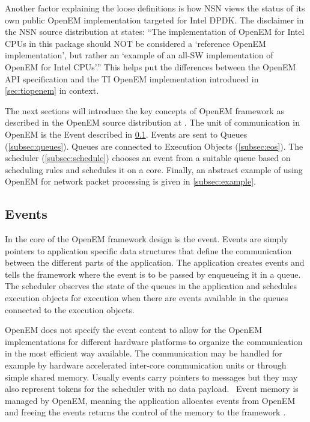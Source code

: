 Another factor explaining the loose definitions is how NSN views the status of its own public OpenEM implementation targeted for Intel DPDK. The disclaimer in the NSN source distribution at \cite{openempage} states: ``The implementation of OpenEM for Intel CPUs in this package should NOT be considered a `reference OpenEM implementation', but rather an `example of an all-SW implementation of OpenEM for Intel CPUs'.'' This helps put the differences between the OpenEM API specification and the TI OpenEM implementation introduced in \ref{sec:tiopenem} in context.

The next sections will introduce the key concepts of OpenEM framework as described in the OpenEM source distribution at \cite{openempage}. The unit of communication in OpenEM is the Event described in \ref{subsec:event}. Events are sent to Queues (\ref{subsec:queues}). Queues are connected to Execution Objects (\ref{subsec:eos}). The scheduler (\ref{subsec:schedule}) chooses an event from a suitable queue based on scheduling rules and schedules it on a core. Finally, an abstract example of using OpenEM for network packet processing is given in \ref{subsec:example}.

\subsection{Events}
\label{subsec:event}
In the core of the OpenEM framework design is the event. Events are simply pointers to application specific data structures that define the communication between the different parts of the application. The application creates events and tells the framework where the event is to be passed by enqueueing it in a queue. The scheduler observes the state of the queues in the application and schedules execution objects for execution when there are events available in the queues connected to the execution objects.~\cite{openemintro}

OpenEM does not specify the event content to allow for the OpenEM implementations for different hardware platforms to organize the communication in the most efficient way available. The communication may be handled for example by hardware accelerated inter-core communication units or through simple shared memory. Usually events carry pointers to messages but they may also represent tokens for the scheduler with no data payload.~\cite{openemintro} Event memory is managed by OpenEM, meaning the application allocates events from OpenEM and freeing the events returns the control of the memory to the framework \cite{openemintro}.

